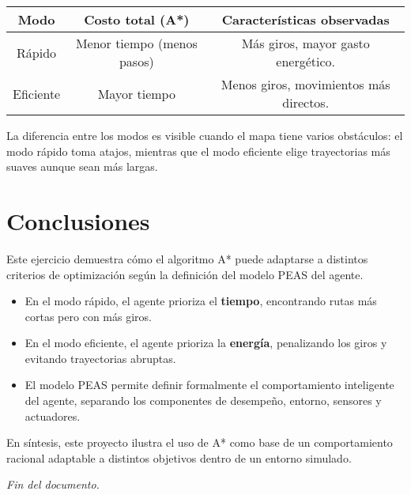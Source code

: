 \documentclass[12pt,a4paper]{article}
\begin{document}
\begin{center}
\begin{tabular}{|c|c|c|}
\hline
\textbf{Modo} & \textbf{Costo total (A*)} & \textbf{Características observadas} \\
\hline
Rápido & Menor tiempo (menos pasos) & Más giros, mayor gasto energético. \\
\hline
Eficiente & Mayor tiempo & Menos giros, movimientos más directos. \\
\hline
\end{tabular}
\end{center}

La diferencia entre los modos es visible cuando el mapa tiene varios obstáculos:  
el modo rápido toma atajos, mientras que el modo eficiente elige trayectorias más suaves aunque sean más largas.

\section{Conclusiones}

Este ejercicio demuestra cómo el algoritmo A* puede adaptarse a distintos criterios de optimización según la definición del modelo PEAS del agente.

\begin{itemize}
    \item En el modo rápido, el agente prioriza el \textbf{tiempo}, encontrando rutas más cortas pero con más giros.
    \item En el modo eficiente, el agente prioriza la \textbf{energía}, penalizando los giros y evitando trayectorias abruptas.
    \item El modelo PEAS permite definir formalmente el comportamiento inteligente del agente, separando los componentes de desempeño, entorno, sensores y actuadores.
\end{itemize}

En síntesis, este proyecto ilustra el uso de A* como base de un comportamiento racional adaptable a distintos objetivos dentro de un entorno simulado.

\vfill
\begin{center}
\textit{Fin del documento.}
\end{center}
\end{document}
